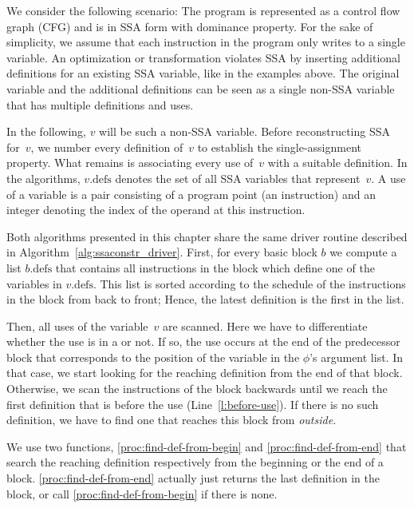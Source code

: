 {We consider the following scenario: The program is represented as a control flow graph (CFG) and is in SSA form with dominance property.
For the sake of simplicity, we assume that each instruction in the program only writes to a single variable.
An optimization or transformation violates SSA by inserting additional definitions for an existing SSA variable, like in the examples above.
The original variable and the additional definitions can be seen as a single non-SSA variable that has multiple definitions and uses.

In the following, $v$ will be such a non-SSA variable.
Before reconstructing SSA for~$v$, we number every definition of~$v$ to
establish the single-assignment property. 
What remains is associating every use of~$v$ with a suitable definition.
In the algorithms, $v.\textrm{defs}$ denotes the set of all SSA variables that represent~$v$.
A use of a variable is a pair consisting of a program point (an instruction) and an integer denoting the index of the operand at this instruction.

Both algorithms presented in this chapter share the same driver routine 
described in Algorithm~\ref{alg:ssaconstr_driver}.
First, for every basic block $b$ we compute a list $b.\textrm{defs}$ that contains all instructions in the block which define one of the variables in $v.\textrm{defs}$.
This list is sorted according to the schedule of the instructions in the block from back to front; Hence, the latest definition is the first in the list.

Then, all uses of the variable~$v$ are scanned.
Here we have to differentiate whether the use is in a \phifun or not.
If so, the use occurs at the end of the predecessor block that corresponds to the position of the variable in the $\phi$'s argument list.
In that case, we start looking for the reaching definition from the end of that block.
Otherwise, we scan the instructions of  the block backwards until we reach the first definition that is before the use (Line~\ref{l:before-use}).
If there is no such definition, we have to find one that reaches this block from \emph{outside.}

We use two functions, \ref{proc:find-def-from-begin} and \ref{proc:find-def-from-end} that search the reaching definition respectively from the beginning or the end of a block.
\ref{proc:find-def-from-end} actually just returns the last definition in the block, or call \ref{proc:find-def-from-begin} if there is none.

}
